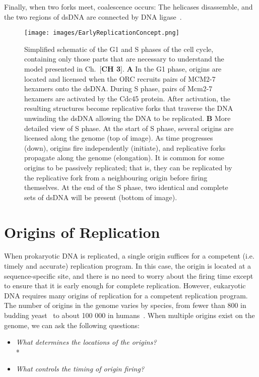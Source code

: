 		Finally, when two forks meet, coalescence occurs:
		The helicases disassemble, and the two regions of dsDNA are connected by DNA ligase~\cite{MolecularCellBiology}.
	
	\begin{figure}[tbh]
		\begin{center}
			\texttt{[image: images/EarlyReplicationConcept.png]}
		\end{center}
			\caption[Events During Replication]{\label{fig:EarlyReplicationConcept} Simplified schematic of the G1 and S phases of the cell cycle, containing only those parts that are necessary to understand the model presented in Ch.~[\textbf{CH 3}].
				\textbf{A} In the G1 phase, origins are located and licensed when the ORC recruits pairs of MCM2-7 hexamers onto the dsDNA.
					During S phase, pairs of Mcm2-7 hexamers are activated by the Cdc45 protein.
					After activation, the resulting structures become replicative forks that traverse the DNA unwinding the dsDNA allowing the DNA to be replicated.
				\textbf{B} More detailed view of S phase.
					At the start of S phase, several origins are licensed along the genome (top of image).
					As time progresses (down), origins fire independently (initiate), and replicative forks propagate along the genome (elongation).
					It is common for some origins to be passively replicated; that is, they can be replicated by the replicative fork from a neighbouring origin before firing themselves.
					At the end of the S phase, two identical and complete sets of dsDNA will be present (bottom of image).}
	\end{figure}
	
	
	\section{Origins of Replication}
	\label{sec:Origins}
	
	When prokaryotic DNA is replicated, a single origin suffices for a competent (i.e. timely and accurate) replication program.
	In this case, the origin is located at a sequence-specific site, and there is no need to worry about the firing time except to ensure that it is early enough for complete replication.
	However, eukaryotic DNA requires many origins of replication for a competent replication program.
	The number of origins in the genome varies by species, from fewer than 800 in budding yeast~\cite{OriDB} to about 100 000 in humans~\cite{OriginsReview}.
	When multiple origins exist on the genome, we can ask the following questions:
	\begin{itemize}
		\item \emph{What determines the locations of the origins?}\\*
		\item \emph{What controls the timing of origin firing?}
	\end{itemize}
	
